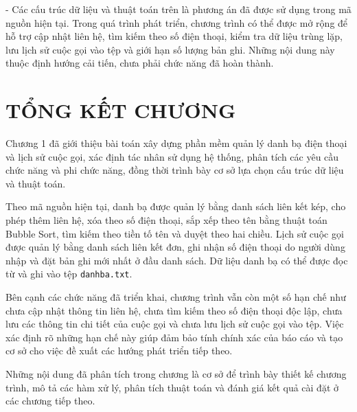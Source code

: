 \documentclass[12pt,a4paper]{report}
\begin{document}
- Các cấu trúc dữ liệu và thuật toán trên là phương án đã được sử dụng trong mã nguồn hiện tại. Trong quá trình phát triển, chương trình có thể được mở rộng để hỗ trợ cập nhật liên hệ, tìm kiếm theo số điện thoại, kiểm tra dữ liệu trùng lặp, lưu lịch sử cuộc gọi vào tệp và giới hạn số lượng bản ghi. Những nội dung này thuộc định hướng cải tiến, chưa phải chức năng đã hoàn thành.\par
\section{TỔNG KẾT CHƯƠNG}

Chương 1 đã giới thiệu bài toán xây dựng phần mềm quản lý danh bạ điện thoại và lịch sử cuộc gọi, xác định tác nhân sử dụng hệ thống, phân tích các yêu cầu chức năng và phi chức năng, đồng thời trình bày cơ sở lựa chọn cấu trúc dữ liệu và thuật toán.\par
Theo mã nguồn hiện tại, danh bạ được quản lý bằng danh sách liên kết kép, cho phép thêm liên hệ, xóa theo số điện thoại, sắp xếp theo tên bằng thuật toán Bubble Sort, tìm kiếm theo tiền tố tên và duyệt theo hai chiều. Lịch sử cuộc gọi được quản lý bằng danh sách liên kết đơn, ghi nhận số điện thoại do người dùng nhập và đặt bản ghi mới nhất ở đầu danh sách. Dữ liệu danh bạ có thể được đọc từ và ghi vào tệp \texttt{danhba.txt}.\par
Bên cạnh các chức năng đã triển khai, chương trình vẫn còn một số hạn chế như chưa cập nhật thông tin liên hệ, chưa tìm kiếm theo số điện thoại độc lập, chưa lưu các thông tin chi tiết của cuộc gọi và chưa lưu lịch sử cuộc gọi vào tệp. Việc xác định rõ những hạn chế này giúp đảm bảo tính chính xác của báo cáo và tạo cơ sở cho việc đề xuất các hướng phát triển tiếp theo.\par
Những nội dung đã phân tích trong chương là cơ sở để trình bày thiết kế chương trình, mô tả các hàm xử lý, phân tích thuật toán và đánh giá kết quả cài đặt ở các chương tiếp theo.\par
\end{document}
